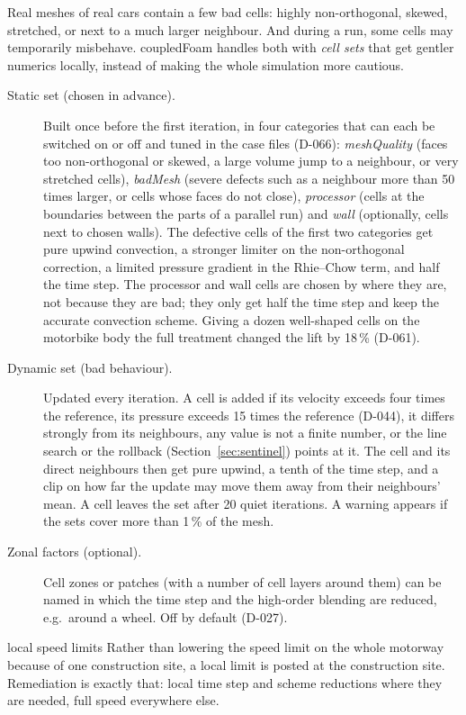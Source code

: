 \documentclass[11pt,a4paper]{article}
\begin{document}
Real meshes of real cars contain a few bad cells: highly non-orthogonal,
skewed, stretched, or next to a much larger neighbour. And during a run,
some cells may temporarily misbehave. coupledFoam handles both with
\emph{cell sets} that get gentler numerics locally, instead of making the
whole simulation more cautious.

\begin{description}
\item[Static set (chosen in advance).] Built once before the first
  iteration, in four categories that can each be switched on or off and
  tuned in the case files (D-066):
  \emph{meshQuality} (faces too non-orthogonal or skewed, a large volume
  jump to a neighbour, or very stretched cells), \emph{badMesh} (severe
  defects such as a neighbour more than 50 times larger, or cells whose
  faces do not close), \emph{processor} (cells at the boundaries between
  the parts of a parallel run) and \emph{wall} (optionally, cells next to
  chosen walls). The defective cells of the first two categories get pure
  upwind convection, a stronger limiter on the non-orthogonal correction,
  a limited pressure gradient in the Rhie--Chow term, and half the time
  step. The processor and wall cells are chosen by where they are, not
  because they are bad; they only get half the time step and keep the
  accurate convection scheme. Giving a dozen well-shaped cells on the
  motorbike body the full treatment changed the lift by 18\,\% (D-061).
\item[Dynamic set (bad behaviour).] Updated every iteration. A cell is
  added if its velocity exceeds four times the reference, its pressure
  exceeds 15 times the reference (D-044), it differs strongly from its
  neighbours, any
  value is not a finite number, or the line search or the rollback
  (Section~\ref{sec:sentinel}) points at it. The cell and its direct
  neighbours then get pure upwind, a tenth of the time step, and a clip on
  how far the update may move them away from their neighbours' mean. A cell
  leaves the set after 20 quiet iterations. A warning appears if the sets
  cover more than 1\,\% of the mesh.
\item[Zonal factors (optional).] Cell zones or patches (with a number of
  cell layers around them) can be named in which the time step and the
  high-order blending are reduced, e.g.\ around a wheel. Off by
  default (D-027).
\end{description}

\begin{intuition}{local speed limits}
  Rather than lowering the speed limit on the whole motorway because of one
  construction site, a local limit is posted at the construction site.
  Remediation is exactly that: local time step and scheme reductions where
  they are needed, full speed everywhere else.
\end{intuition}
\end{document}
